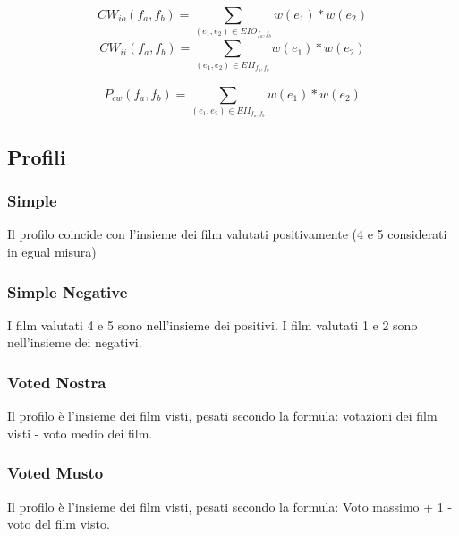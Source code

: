 \begin{equation}
CW_{io}(f_a,f_b) = \sum\limits_{(e_1,e_2) \in EIO_{f_a,f_b}^{}}^{}{w(e_1)*w(e_2)}
\end{equation}
\begin{equation}
CW_{ii}(f_a,f_b) = \sum\limits_{(e_1,e_2) \in EII_{f_a,f_b}^{}}^{}{w(e_1)*w(e_2)}
\end{equation}


\begin{equation}
P_{cw}(f_a,f_b) = \sum\limits_{(e_1,e_2) \in EII_{f_a,f_b}^{}}^{}{w(e_1)*w(e_2)}
\end{equation}

\subsection{Profili}

\subsubsection{Simple}
Il profilo coincide con l'insieme dei film valutati positivamente (4 e 5 considerati in egual misura)

\subsubsection{Simple Negative}

I film valutati 4 e 5 sono nell'insieme dei positivi. I film valutati 1 e 2 sono nell'insieme dei negativi.


\subsubsection{Voted Nostra}


Il profilo è l'insieme dei film visti, pesati secondo la formula:
votazioni dei film visti - voto medio dei film.

\subsubsection{Voted Musto}

Il profilo è l'insieme dei film visti, pesati secondo la formula:
Voto massimo + 1 - voto del film visto.

